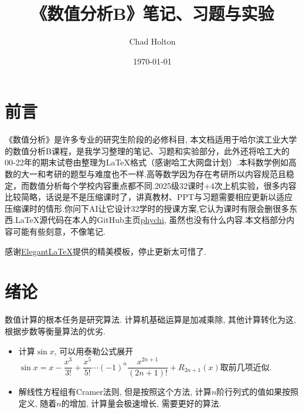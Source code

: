 \documentclass[lang=cn,newtx,12pt,scheme=chinese]{elegantbook}
\title{《数值分析B》笔记、习题与实验}
\author{Chad Holton}
\institute{哈尔滨工业大学能源科学与工程学院}
\date{\today}
\begin{document}
\maketitle
\frontmatter

\tableofcontents

\mainmatter
\chapter*{前言}
《数值分析》是许多专业的研究生阶段的必修科目, 本文档适用于哈尔滨工业大学的数值分析B课程，是我学习整理的笔记、习题和实验部分，此外还将哈工大的00-22年的期末试卷由整理为\LaTeX 格式（感谢哈工大网盘计划）.本科数学例如高数的大一和考研的题型与难度也不一样.高等数学因为存在考研所以内容规范且稳定，而数值分析每个学校内容重点都不同.2025级32课时+4次上机实验，很多内容比较简略，话说是不是压缩课时了，讲真教材、PPT与习题需要相应更新以适应压缩课时的情形.你问下AI让它设计32学时的授课方案,它认为课时有限会删很多东西.\LaTeX 源代码在本人的GitHub主页\href{https://github.com/phychi}{phychi}, 虽然也没有什么内容.本文档部分内容可能有些刻意，不像笔记.

感谢\href{https://github.com/ElegantLaTeX}{ElegantLaTeX}提供的精美模板，停止更新太可惜了.
\chapter{绪论}
数值计算的根本任务是研究算法. 计算机基础运算是加减乘除, 其他计算转化为这, 根据步数等衡量算法的优劣.
\begin{itemize}
	\item 计算$\sin x$, 可以用泰勒公式展开$\sin x=x-\dfrac{x^3}{3!}+\dfrac{x^5}{5!}\cdots(-1)^n\dfrac{x^{2n+1}}{(2n+1)!}+R_{2n+1}(x)$取前几项近似.
	\item 解线性方程组有Cramer法则, 但是按照这个方法, 计算$n$阶行列式的值如果按照定义, 随着$n$的增加, 计算量会极速增长, 需要更好的算法.
\end{itemize}
\end{document}
